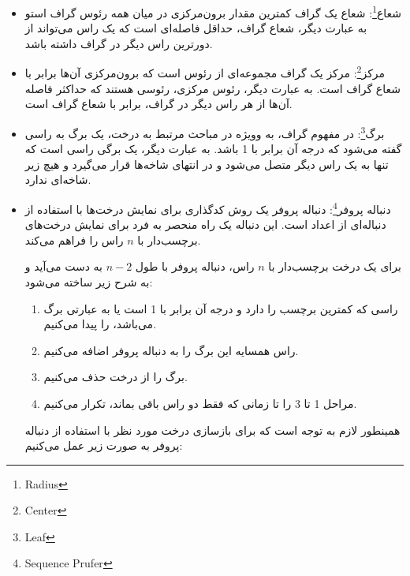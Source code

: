 \documentclass[a4paper,10pt]{article}
\begin{document}
\begin{itemize}
        \item شعاع\footnote{\hspace{2pt}Radius}: شعاع یک گراف کمترین مقدار برون‌مرکزی در میان همه رئوس گراف استو به عبارت دیگر، شعاع گراف، حداقل فاصله‌ای است که یک راس می‌تواند از دورترین راس دیگر در گراف داشته باشد.

        \item مرکز\footnote{\hspace{2pt}Center}: مرکز یک گراف مجموعه‌ای از رئوس است که برون‌مرکزی آن‌ها برابر با شعاع گراف است. به عبارت دیگر، رئوس مرکزی، رئوسی هستند که حداکثر فاصله آن‌ها از هر راس دیگر در گراف، برابر با شعاع گراف است.
        
        \item برگ\footnote{\hspace{2pt}Leaf}: در مفهوم گراف، به وویژه در مباحث مرتبط به درخت، یک برگ به راسی گفته می‌شود که درجه آن برابر با 1 باشد. به عبارت دیگر، یک برگی راسی است که تنها به یک راس دیگر متصل می‌شود و در انتهای شاخه‌ها قرار می‌گیرد و هیچ زیر شاخه‌ای ندارد.

        \item دنباله پروفر\footnote{\hspace{2pt}Sequence Prufer}: دنباله پروفر یک روش کدگذاری برای نمایش درخت‌ها با استفاده از دنباله‌ای از اعداد است. این دنباله یک  راه منحصر به فرد برای نمایش درخت‌های برچسب‌دار با $n$ راس را فراهم می‌کند.
        
        برای یک درخت برچسب‌دار با $n$ راس، دنباله پروفر با طول $n-2$ به دست می‌آید و به شرح زیر ساخته می‌شود:

        \begin{enumerate}
            
            \item راسی که کمترین برچسب‌ را دارد و درجه آن برابر با 1 است یا به عبارتی برگ می‌باشد، را پیدا می‌کنیم.

            \item راس همسایه این برگ را به دنباله پروفر اضافه می‌کنیم.

            \item برگ را از درخت حذف می‌کنیم.

            \item مراحل 1 تا 3 را تا زمانی که فقط دو راس باقی بماند، تکرار می‌کنیم.

        \end{enumerate}

        همینطور لازم به توجه است که برای بازسازی درخت مورد نظر با استفاده از دنباله پروفر به صورت زیر عمل می‌کنیم:


\end{itemize}
\end{document}
